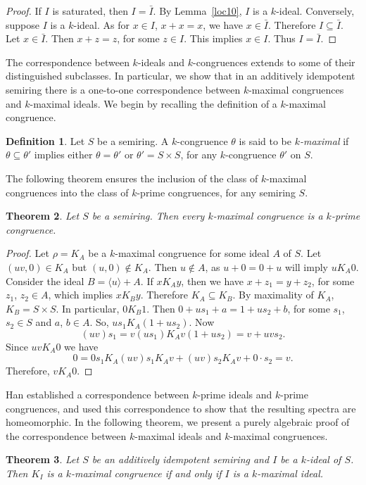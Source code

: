 \documentclass[11pt,leqno]{amsart}
\newtheorem{theorem}{Theorem}[section]
\theoremstyle{definition}
\newtheorem{definition}[theorem]{Definition}
\numberwithin{equation}{section}
\begin{document}
 \begin{proof}
     If $I$ is saturated, then $I=\bar{I}$. By Lemma~\ref{loc10}, $I$ is a $k$-ideal. Conversely, suppose $I$ is a $k$-ideal. As for $x\in I$, $x+x=x$, we have $x\in \bar{I}$. Therefore $I\subseteq \bar{I}$. Let $x\in \bar{I}$. Then $x+z=z$, for some $z\in I$. This implies $x\in I$. Thus $I=\bar{I}$. 
 \end{proof}
The correspondence between $k$-ideals and $k$-congruences extends to some of their distinguished subclasses. In particular, we show that in an additively idempotent semiring there is a one-to-one correspondence between $k$-maximal congruences and $k$-maximal ideals. We begin by recalling the definition of a $k$-maximal congruence.
 \begin{definition}
     Let $S$ be a semiring. A $k$-congruence $\theta$ is said  to be \emph{$k$-maximal} if $\theta\subseteq \theta'$ implies either $\theta=\theta'$ or $\theta'=S\times S$, for any $k$-congruence $\theta'$ on $S$.
 \end{definition}
 The following theorem ensures the inclusion of the class of $k$-maximal congruences into the class of $k$-prime congruences, for any semiring $S$. 
  \begin{theorem}
    Let $S$ be a semiring. Then every $k$-maximal congruence is a $k$-prime congruence.
 \end{theorem}
 
 \begin{proof}
     Let $\rho=K_A$ be a $k$-maximal congruence for some ideal $A$ of $S$. Let $(uv,0)\in K_A$ but $(u,0)\notin K_A$. Then $u\notin A$, as $u+0=0+u$ will imply $uK_A0$. Consider the ideal $B=\langle u \rangle +A$. If $xK_Ay$, then we have $x+z_1=y+z_2$, for some $z_1$, $z_2\in A$, which implies $xK_By$. Therefore $K_A\subseteq K_B$. By maximality of $K_A$, $K_B=S\times S$. In particular, $0K_B1$. Then $0+us_1+a=1+us_2+b$, for some $s_1$, $s_2\in S$ and $a$, $b\in A$. So, $us_1 K_A(1+us_2)$. Now \[(uv)s_1=v(us_1)K_Av(1+us_2)=v+uvs_2.\] Since $uvK_A0$ we have \[0=0s_1K_A(uv)s_1K_Av+(uv)s_2K_Av+0\cdot s_2=v.\] Therefore, $vK_A0$.
 \end{proof}

 Han \cite[Theorem 5.4]{Han21} established a correspondence between $k$-prime ideals and $k$-prime congruences, and used this correspondence to show that the resulting spectra are homeomorphic. In the following theorem, we present a purely algebraic proof of the correspondence between $k$-maximal ideals and $k$-maximal congruences. 
 \begin{theorem}
 	
     Let $S$ be an additively idempotent semiring and $I$ be a $k$-ideal of $S$. Then $K_I$ is a $k$-maximal congruence if and only if $I$ is a $k$-maximal ideal.
 \end{theorem}
 
\end{document}
